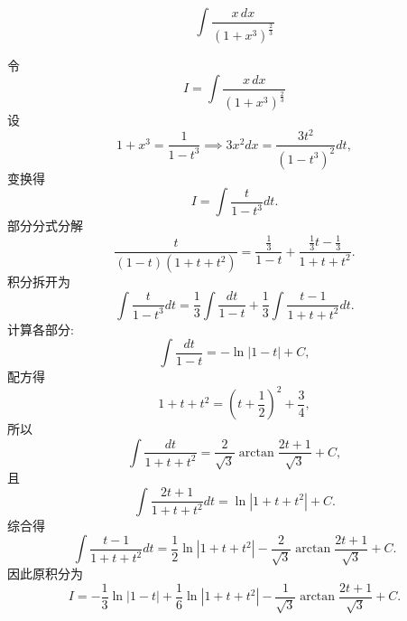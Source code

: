 \begin{questions}
    \question 
    \[
    \int \frac{x \, dx}{(1 + x^3)^{\frac{2}{3}}}
    \]
    \begin{solution}
        令
        \[
        I = \int \frac{x \, dx}{(1 + x^3)^{\frac23}}
        \]
        设
        \[
        1 + x^3 = \frac{1}{1 - t^3} \implies 3x^2 dx = \frac{3 t^2}{(1 - t^3)^2} dt,
        \]
        变换得
        \[
        I = \int \frac{t}{1 - t^3} dt.
        \]
        部分分式分解
        \[
        \frac{t}{(1 - t)(1 + t + t^2)} = \frac{\frac13}{1 - t} + \frac{\frac{1}{3} t - \frac{1}{3}}{1 + t + t^2}.
        \]
        积分拆开为
        \[
        \int \frac{t}{1 - t^3} dt = \frac{1}{3} \int \frac{dt}{1 - t} + \frac{1}{3} \int \frac{t - 1}{1 + t + t^2} dt.
        \]
        计算各部分:
        \[
        \int \frac{dt}{1 - t} = -\ln|1 - t| + C,
        \]
        配方得
        \[
        1 + t + t^2 = \left(t + \frac{1}{2}\right)^2 + \frac{3}{4},
        \]
        所以
        \[
        \int \frac{dt}{1 + t + t^2} = \frac{2}{\sqrt{3}} \arctan \frac{2t + 1}{\sqrt{3}} + C,
        \]
        且
        \[
        \int \frac{2t + 1}{1 + t + t^2} dt = \ln|1 + t + t^2| + C.
        \]
        综合得
        \[
        \int \frac{t - 1}{1 + t + t^2} dt = \frac{1}{2} \ln|1 + t + t^2| - \frac{2}{\sqrt{3}} \arctan \frac{2t + 1}{\sqrt{3}} + C.
        \]
        因此原积分为
        \[
        I = -\frac{1}{3} \ln|1 - t| + \frac{1}{6} \ln|1 + t + t^2| - \frac{1}{\sqrt{3}} \arctan \frac{2t + 1}{\sqrt{3}} + C.
        \]
    \end{solution}
        

\end{questions}
